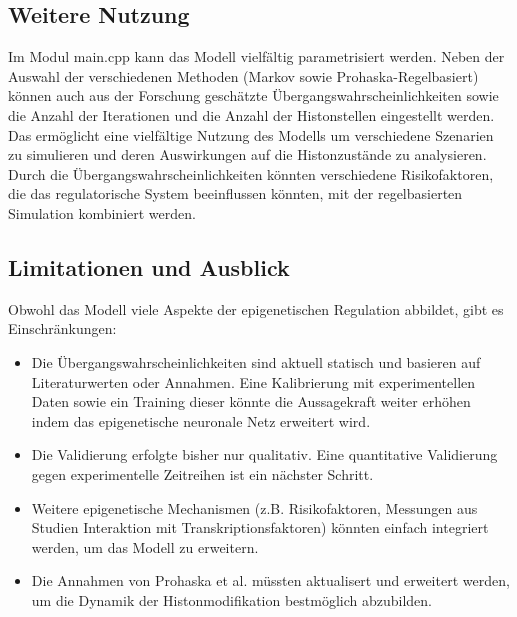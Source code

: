 \documentclass{SeminarV2}
\begin{document}
\subsection{Weitere Nutzung}
Im Modul main.cpp kann das Modell vielfältig parametrisiert werden. Neben der Auswahl der verschiedenen Methoden (Markov sowie Prohaska-Regelbasiert) können auch aus der Forschung geschätzte Übergangswahrscheinlichkeiten sowie die Anzahl der Iterationen und die Anzahl der Histonstellen eingestellt werden.
Das ermöglicht eine vielfältige Nutzung des Modells um verschiedene Szenarien zu simulieren und deren Auswirkungen auf die Histonzustände zu analysieren.
Durch die Übergangswahrscheinlichkeiten könnten verschiedene Risikofaktoren, die das regulatorische System beeinflussen könnten, mit der regelbasierten Simulation kombiniert werden.

\subsection{Limitationen und Ausblick}
Obwohl das Modell viele Aspekte der epigenetischen Regulation abbildet, gibt es Einschr\"{a}nkungen:
\begin{itemize}
    \item Die \"{U}bergangswahrscheinlichkeiten sind aktuell statisch und basieren auf Literaturwerten oder Annahmen. Eine Kalibrierung mit experimentellen Daten sowie ein Training dieser k\"{o}nnte die Aussagekraft weiter erh\"{o}hen indem das epigenetische neuronale Netz erweitert wird.
    \item Die Validierung erfolgte bisher nur qualitativ. Eine quantitative Validierung gegen experimentelle Zeitreihen ist ein n\"{a}chster Schritt.
    \item Weitere epigenetische Mechanismen (z.B. Risikofaktoren, Messungen aus Studien Interaktion mit Transkriptionsfaktoren) k\"{o}nnten einfach integriert werden, um das Modell zu erweitern.
    \item Die Annahmen von Prohaska et al. müssten aktualisert und erweitert werden, um die Dynamik der Histonmodifikation bestmöglich abzubilden.
\end{itemize}
\end{document}

